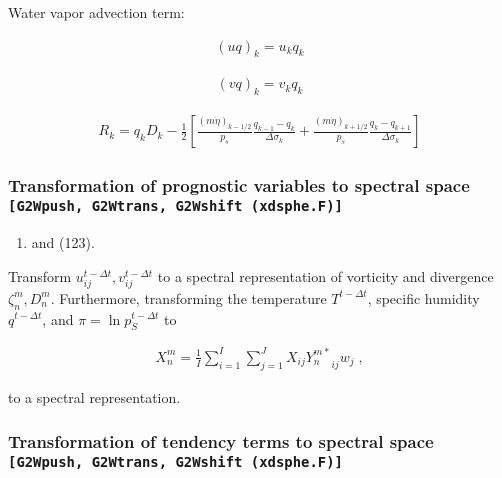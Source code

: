 Water vapor advection term:

\begin{eqnarray}
 (u q)_k  = u_k q_k
\end{eqnarray}

\begin{eqnarray}
 (v q)_k  = v_k q_k
\end{eqnarray}

\begin{eqnarray}
R_k  =  q_k D_k 
       - \frac{1}{2} 
             \left[   \frac{(m\dot{\eta})_{k-1/2}}{p_s} \frac{q_{k-1} - q_k}{\Delta\sigma_k}
               + \frac{(m\dot{\eta})_{k+1/2}}{p_s} \frac{q_k   - q_{k+1}}{\Delta\sigma_k} \right]
\end{eqnarray}

\hypertarget{transformation-of-prognostic-variables-to-spectral-space-g2wpush-g2wtrans-g2wshift-xdsphe.f}{%
\subsubsection{\texorpdfstring{Transformation of prognostic variables to
spectral space
\texttt{{[}G2Wpush,\ G2Wtrans,\ G2Wshift\ (xdsphe.F){]}}}{Transformation of prognostic variables to spectral space {[}G2Wpush, G2Wtrans, G2Wshift (xdsphe.F){]}}}\label{transformation-of-prognostic-variables-to-spectral-space-g2wpush-g2wtrans-g2wshift-xdsphe.f}}

\begin{enumerate}
\def\labelenumi{(\arabic{enumi})}
\setcounter{enumi}{121}
\tightlist
\item
  and (123).
\end{enumerate}

Transform \(u_{ij}^{t-\Delta t}, v_{ij}^{t-\Delta t}\) to a spectral
representation of vorticity and divergence \(\zeta_n^m, D_n^m\).
Furthermore, transforming the temperature \(T^{t-\Delta t}\), specific
humidity \(q^{t-\Delta t}\), and \(\pi = \ln p_S^{t-\Delta t}\) to

\begin{eqnarray}
  X_n^m  =  \frac{1}{I} \sum_{i=1}^{I} \sum_{j=1}^{J}  
               X_{ij} {Y_n^{m *}}_{ij}  w_j \; ,
\end{eqnarray}

to a spectral representation.

\hypertarget{transformation-of-tendency-terms-to-spectral-space-g2wpush-g2wtrans-g2wshift-xdsphe.f}{%
\subsubsection{\texorpdfstring{Transformation of tendency terms to
spectral space
\texttt{{[}G2Wpush,\ G2Wtrans,\ G2Wshift\ (xdsphe.F){]}}}{Transformation of tendency terms to spectral space {[}G2Wpush, G2Wtrans, G2Wshift (xdsphe.F){]}}}\label{transformation-of-tendency-terms-to-spectral-space-g2wpush-g2wtrans-g2wshift-xdsphe.f}}

